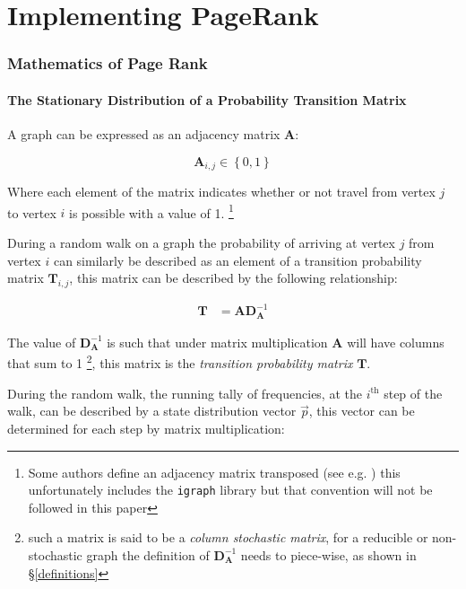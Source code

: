 \documentclass[11pt]{report}
\begin{document}
\part{Implementing PageRank}
\section{Mathematics of Page Rank}
\label{PageRank-Generally}
\subsection{The Stationary Distribution of a Probability Transition Matrix}
\label{stationary-distribution-of-t}
A graph can be expressed as an adjacency matrix \(\mathbf{A}\):

\[
\mathbf{A}_{i,j} \in \left\{ 0,1 \right\}
\]

Where each element of the matrix indicates whether or not travel from
vertex \(j\) to vertex \(i\) is possible with a value of 1. \footnote{Some
authors define an adjacency matrix transposed (see e.g.
\cite{rosenDiscreteMathematicsIts2007,meghabghabSearchEnginesLink2008})
this unfortunately includes the \texttt{igraph} library
\cite{gaborcsardiIgraphManualPages2019} but that convention will not be
followed in this paper}

During a random walk on a graph the probability of arriving at vertex \(j\) from vertex
\(i\) can similarly be described as an element of a transition probability
matrix \(\mathbf{T}_{i,j}\), this matrix can be described by the following
relationship:

\begin{align}
\mathbf{T} &= \mathbf{A} \mathbf{D}^{-1}_{\mathbf{A}} \label{eq:basic-trans-def}
\end{align}

The value of \(\mathbf{D}^{-1}_{\mathbf{A}}\) is such that under matrix
multiplication \(\mathbf{A}\) will have columns that sum to 1 \footnote{such a matrix is said to be a \emph{column stochastic
matrix}, for a
reducible or non-stochastic graph the definition of
\(\mathbf{D}^{-1}_{\mathbf{A}}\) needs to piece-wise, as shown in \S \ref{definitions}}, this matrix is the \emph{transition probability
matrix} \(\mathbf{T}\).

During the random walk, the running tally of frequencies, at the
\(i^{\mathrm{th}}\) step of the walk, can be described by a state distribution
vector \(\vec{p}\), this vector can be determined for each step by matrix
multiplication:
\end{document}
